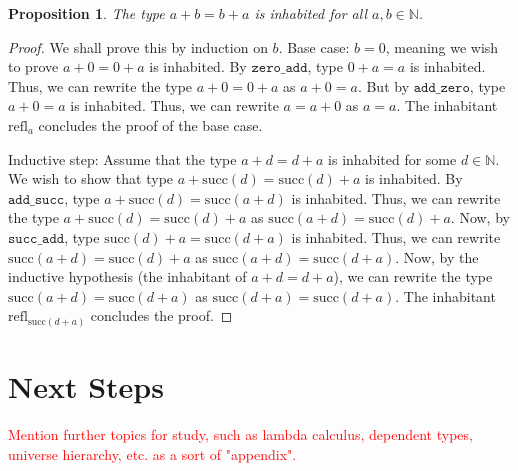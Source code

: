 \documentclass[12pt]{article}
\newtheorem{proposition}{Proposition}[section]
\theoremstyle{definition}
\theoremstyle{remark}
\begin{document}
\begin{proposition}
  The type $a + b = b + a$ is inhabited for all $a, b \in \mathbb{N}$.
\end{proposition}
\begin{proof}
  We shall prove this by induction on $b$. Base case: $b = 0$, meaning we wish to prove $a + 0 = 0 + a$ is inhabited. By $\texttt{zero\_add}$, type $0 + a = a$ is inhabited. Thus, we can rewrite the type $a + 0 = 0 + a$ as $a + 0 = a$. But by $\texttt{add\_zero}$, type $a + 0 = a$ is inhabited. Thus, we can rewrite $a = a + 0$ as $a = a$. The inhabitant $\text{refl}_a$ concludes the proof of the base case. 
  
  Inductive step: Assume that the type $a + d = d + a$ is inhabited for some $d \in \mathbb{N}$. We wish to show that type $a + \text{succ}(d) = \text{succ}(d) + a$ is inhabited. By $\texttt{add\_succ}$, type $a + \text{succ}(d) = \text{succ}(a + d)$ is inhabited. Thus, we can rewrite the type $a + \text{succ}(d) = \text{succ}(d) + a$ as $\text{succ}(a+d) = \text{succ}(d) + a$. Now, by $\texttt{succ\_add}$, type $\text{succ}(d) + a = \text{succ}(d+a)$ is inhabited. Thus, we can rewrite $\text{succ}(a+d) = \text{succ}(d) + a$ as $\text{succ}(a+d) = \text{succ}(d+a)$. Now, by the inductive hypothesis (the inhabitant of $a+d = d+a$), we can rewrite the type $\text{succ}(a+d) = \text{succ}(d+a)$ as $\text{succ}(d+a) = \text{succ}(d+a)$. The inhabitant $\text{refl}_{\text{succ}(d+a)}$ concludes the proof. 
\end{proof} 



\section{Next Steps}

\textcolor{red}{Mention further topics for study, such as lambda calculus, dependent types, universe hierarchy, etc. as a sort of "appendix".}


\printbibliography
\end{document}
